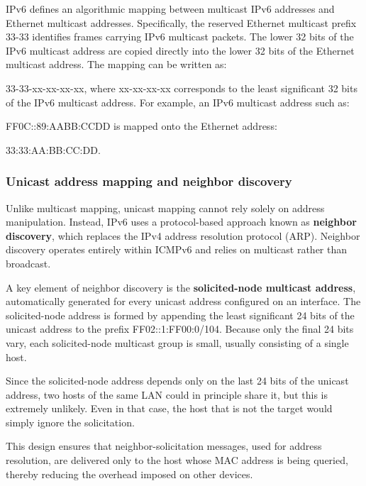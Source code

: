 IPv6 defines an algorithmic mapping between multicast IPv6 addresses and Ethernet multicast addresses. Specifically, the reserved Ethernet multicast prefix 33-33 identifies frames carrying IPv6 multicast packets. The lower 32 bits of the IPv6 multicast address are copied directly into the lower 32 bits of the Ethernet multicast address. The mapping can be written as:

33-33-xx-xx-xx-xx, where xx-xx-xx-xx corresponds to the least significant 32 bits of the IPv6 multicast address. For example, an IPv6 multicast address such as:

FF0C::89:AABB:CCDD is mapped onto the Ethernet address:

33:33:AA:BB:CC:DD.

\begin{center}
\end{center}

\subsubsection*{Unicast address mapping and neighbor discovery}

Unlike multicast mapping, unicast mapping cannot rely solely on address manipulation. Instead, IPv6 uses a protocol-based approach known as \textbf{neighbor discovery}, which replaces the IPv4 address resolution protocol (ARP). Neighbor discovery operates entirely within ICMPv6 and relies on multicast rather than broadcast.

A key element of neighbor discovery is the \textbf{solicited-node multicast address}, automatically generated for every unicast address configured on an interface. The solicited-node address is formed by appending the least significant 24 bits of the unicast address to the prefix FF02::1:FF00:0/104. Because only the final 24 bits vary, each solicited-node multicast group is small, usually consisting of a single host.

Since the solicited-node address depends only on the last 24 bits of the unicast
address, two hosts of the same LAN could in principle share it, but this is
extremely unlikely. Even in that case, the host that is not the target would
simply ignore the solicitation.

This design ensures that neighbor-solicitation messages, used for address resolution, are delivered only to the host whose MAC address is being queried, thereby reducing the overhead imposed on other devices.

